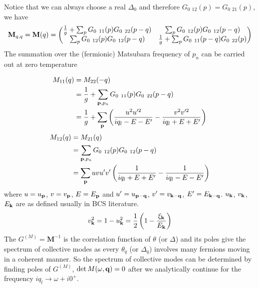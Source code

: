 Notice that we can always choose a real $\Delta_{0}$ and therefore $G_{0}{\ _{12}}(p)=G_{0}{\ _{21}}(p)$, we have 
\begin{equation}
\mathbf{M}_{q,q}=\mathbf{M}(q)=
\begin{pmatrix}
\nth{g}+\sum_{p}G_{0}{\ }_{11}(p)G_{0}{\ }_{22}(p-q)&\sum_{p}G_{0}{\ }_{12}(p)G_{0}{\ }_{12}(p-q)\\
\sum_{p}G_{0}{\ }_{12}(p)G_{0}{\ }_{12}(p-q)&\nth{g}+\sum_{p}G_{0}{\ }_{11}(p-q)G_{0}{\ }_{22}(p)
\end{pmatrix}
\end{equation}
The summation over  the (fermionic) Matsubara frequency of $p_{n}$ can be carried out at zero temperature

\begin{equation}
\begin{split}
M_{11}(q)&=M_{22}(-q)\\
	&=\nth{g}+\sum_{\vp{,}p_{n}}G_{0}{\ }_{11}(p)G_{0}{\ }_{22}(p-q)\\
	&=\nth{g}+\sum_{\vp}\br{\frac{u^{2}u'^{2}}{iq_{l}-E-E'}-\frac{v^{2}v'^{2}}{iq_{l}+E+E'}}
\end{split}
\end{equation}
\begin{equation}
\begin{split}
M_{12}(q)&=M_{21}(q)\\
	&=\sum_{\mathbf{p}{,}p_{n}}G_{0}{\ }_{12}(p)G_{0}{\ }_{12}(p-q)\\
	&=\sum_{\mathbf{p}}uvu'v'\left(\frac{1}{iq_{l}+E+E'}-\frac{1}{iq_{l}-E-E'}\right)
\end{split}
\end{equation}
where $u=u_{\mathbf{p}}$, $v=v_{\mathbf{p}}$, $E=E_{\mathbf{p}}$ and $u'=u_{\mathbf{p}-\mathbf{q}}$, $v'=v_{\mathbf{k}-\mathbf{q}}$, $E'=E_{\mathbf{k}-\mathbf{q}}$.  $u_{\mathbf{k}}$, $v_{\mathbf{k}}$, $E_{\mathbf{k}}$ are as defined usually in BCS literature. 
\begin{equation}
v_{\mathbf{k}}^{2}=1-u_{\mathbf{k}}^{2}=\frac{1}{2}\left(1-\frac{\xi_{\mathbf{k}}}{E_{\mathbf{k}}}\right)
\end{equation}
 The $G^{(M)}=\mathbf{M}^{-1}$ is the correlation function of $\theta$ (or $\Delta$) and its poles give the spectrum of collective modes as every  $\theta_{q}$ (or $\Delta_{q}$) involves many fermions moving in a coherent manner.  So the spectrum of collective modes can be determined by finding poles of $G^{(M)}$, $\det{M(\omega,\ensuremath{\mathbf{q}})}=0$ after we analytically continue for the frequency $iq_{l}\rightarrow\omega+i0^{+}$.  
 
